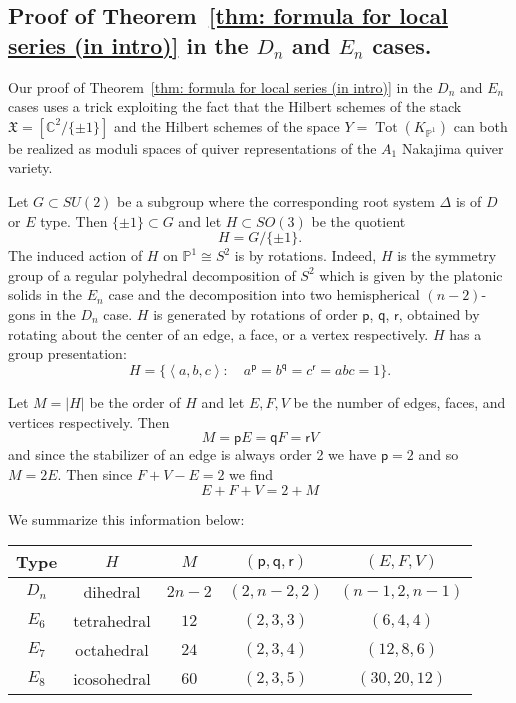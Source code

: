 \documentclass{amsart}
\theoremstyle{definition}
\newcommand{\CC} {{\mathbb C}}          %
\newcommand{\PP}{\mathbb{P}}
\newcommand{\X}{\mathfrak{X}}
\newcommand{\varp}{\mathsf{p}}
\newcommand{\varq}{\mathsf{q}}
\newcommand{\varr}{\mathsf{r}}
\newcommand{\jim}{\color{red}}
\begin{document}
\subsection{Proof of Theorem~\ref{thm: formula for local series (in
intro)} in the $D_{n}$ and $E_{n}$ cases.}\label{subsec: proof of Dn
and En cases of local series}

Our proof of Theorem~\ref{thm: formula for local series (in intro)} in
the $D_{n}$ and $E_{n}$ cases uses  a {\jim trick exploiting the fact
that the Hilbert schemes of the stack $\X =[\CC^{2}/\{\pm 1 \}]$ and
the Hilbert schemes of the space $Y=\operatorname{Tot}(K_{\PP^{1}})$
can both be realized as moduli spaces of quiver representations of the
$A_{1}$ Nakajima quiver variety.}

Let $G\subset SU(2)$ be a subgroup where the corresponding root system
$\Delta$ is of $D$ or $E$ type. Then $\{\pm 1 \}\subset G$ and let
$H\subset SO(3)$ be the quotient
\[
H=G/\{\pm 1 \}.
\]
The induced action of $H$ on $\PP^{1}\cong S^{2}$ is by
rotations. Indeed, $H$ is the symmetry group of a regular polyhedral
decomposition of $S^{2}$ which is given by the platonic solids in the
$E_{n}$ case and the decomposition into two hemispherical $(n-2)$-gons
in the $D_{n}$ case. $H$ is generated by rotations of order $\varp$,
$\varq$, $\varr$, obtained by rotating about the center of an edge, a
face, or a vertex respectively. $H$ has a group presentation:
\[
H=\{\left\langle a,b,c \right\rangle :\quad a^{\varp} = b^{\varq} =
c^{\varr} = abc=1 \}.
\]

Let $M=|H|$ be the order of $H$ and let $E,F,V$ be the number of
edges, faces, and vertices respectively. Then
\[
M=\varp E = \varq F = \varr V
\]
and since the stabilizer of an edge is always order 2 we have $\varp =2$
and so $M=2E$. Then since $F+V-E=2$ we find
\[
E+F+V = 2 + M
\]

We summarize this information below:

\begin{center}
\begin{tabular}{|c|c|c|c|c|}
\hline
Type &	$H$ &	$M$&	$(\varp ,\varq ,\varr )$ &	$(E,F,V)$\\ \hline \hline 
$D_{n}$     & dihedral & $2n-2$ & $(2,n-2,2)$& $(n-1,2,n-1)$	\\ \hline
$E_{6}$     & tetrahedral & $12$ & $(2,3,3)$& $(6,4,4)$	\\ \hline
$E_{7}$     & octahedral & $24$ & $(2,3,4)$& $(12,8,6)$	\\ \hline
$E_{8}$     & icosohedral & $60$ & $(2,3,5)$& $(30,20,12)$	\\ \hline
\end{tabular}
\end{center}
\end{document}
